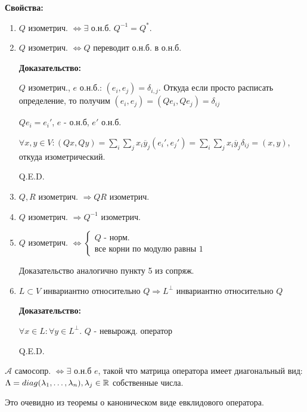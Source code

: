 \textbf{Свойства:}

\begin{enumerate}
    \item $Q$ изометрич. $\Leftrightarrow \exists $ о.н.б. $Q^{-1}=Q^*$.
    \item $Q$ изометрич. $\Leftrightarrow Q$ переводит о.н.б. в о.н.б.
    
    \textbf{Доказательство:}

     $Q$ изометрич., $e$ о.н.б.: $(e_i,e_j) = \delta_{i,j}$. Откуда если просто расписать определение, то получим $(e_i,e_j) = (Q e_i,Qe_j) = \delta_{ij}$

     $Qe_i = e_i'$, $e$ - о.н.б, $e'$ о.н.б.

    $\forall x,y \in V: (Qx,Qy) = \sum\limits_{i}\sum\limits_{j}x_i\overline{y}_j (e_i',e_j') = \sum\limits_{i}\sum\limits_{j}x_i\overline{y}_j \delta_{ij}= (x,y)$, откуда изометрический.

    \hfill Q.E.D.

    \item $Q,R$ изометрич. $\Rightarrow QR$ изометрич.
    \item $Q$ изометрич. $\Rightarrow Q^{-1}$ изометрич.
    \item $Q$ изометрич. $\Leftrightarrow \begin{cases}
        Q \text{ - норм.}\\
        \text{все корни по модулю равны 1}
    \end{cases}$

    Доказательство аналогично пункту 5 из сопряж.
    \item  $L \subset V$ инвариантно относительно $Q \Rightarrow L^\perp$ инвариантно относительно $Q$

    \textbf{Доказательство:}

    $\forall x\in L: \forall y \in L^\perp$. $Q$ - невырожд. оператор

    

    \hfill Q.E.D.    
\end{enumerate}

$\mathcal{A}$ самосопр. $\Leftrightarrow \exists$ о.н.б $e$, такой что матрица оператора имеет  диагональный вид: $\Lambda =  diag(\lambda_1,\ldots,\lambda_n), \lambda_j\in\mathbb{R}$ собственные числа.

Это очевидно из теоремы о каноническом виде евклидового оператора.

